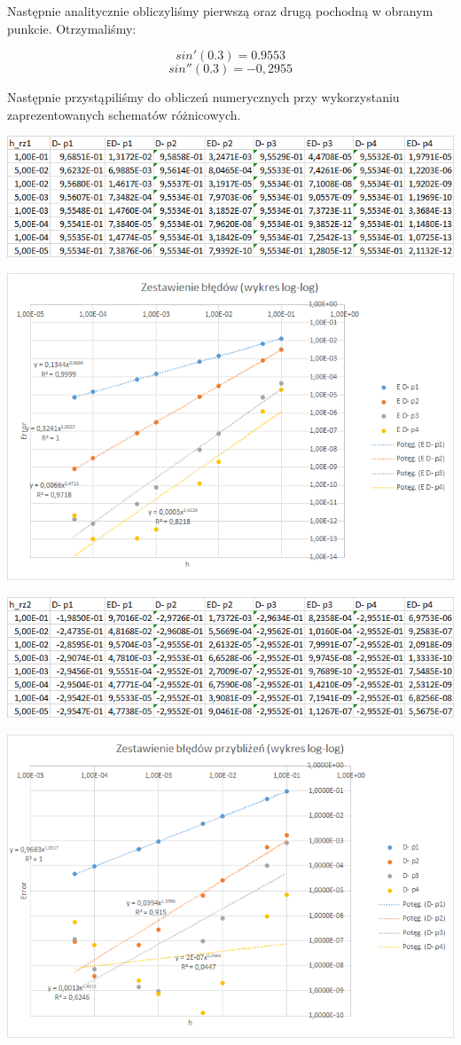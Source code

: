 Następnie analitycznie obliczyliśmy pierwszą oraz drugą pochodną w obranym punkcie. Otrzymaliśmy:

$$sin'(0.3)=0.9553$$
$$sin''(0.3)=-0,2955$$

Następnie przystąpiliśmy do obliczeń numerycznych przy wykorzystaniu zaprezentowanych schematów różnicowych.
\newpage

\includegraphics{Lab2/charts/rz1_log_Db_dane.png}

\includegraphics{Lab2/charts/rz1_log_Db.png} 
\newpage


\includegraphics{Lab2/charts/rz2_log_Db_dane.png}

\includegraphics{Lab2/charts/rz2_log_Db.png}
\newpage


